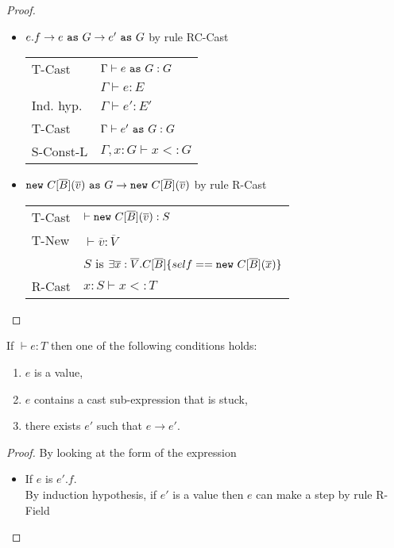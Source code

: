 \documentclass[preprint,nocopyrightspace,9pt]{sigplanconf}
\begin{document}
\begin{proof}
\begin{itemize}

\item $e.f \rightarrow e~{\tt as}~G\rightarrow e'~{\tt as}~G$ by rule {\sc RC-Cast}
\\
\begin{tabular}{ll}
{\sc T-Cast} & $\Gamma\vdash e~{\tt as}~G:G$
\\
& $\Gamma\vdash e:E$
\\
Ind. hyp. & $\Gamma\vdash e':E'$
\\
{\sc T-Cast} & $\Gamma\vdash e'~{\tt as}~G:G$
\\
{\sc S-Const-L} & $\Gamma,x:G\vdash x<:G$
\end{tabular}


\item ${\tt new}~C[\overline{B}](\overline{v})~{\tt as}~G\rightarrow {\tt new}~C[\overline{B}](\overline{v})$ by rule {\sc R-Cast}
\\
\begin{tabular}{ll}
{\sc T-Cast} & $\vdash{\tt new}~C[\overline{B}](\overline{v}):S$
\\
{\sc T-New} &  $\vdash\overline{v}:\overline{V}$
\\
& $S$ is $\exists\overline{x}:\overline{V}.C[\overline{B}]\{self=={\tt new}~C[\overline{B}](\overline{x})\}$
\\
{\sc R-Cast} & $x:S\vdash x<:T$
\end{tabular}
\end{itemize}
\end{proof}


\begin{thm}[Progress]
If $\vdash e:T$ then one of the following conditions holds:
\begin{enumerate}
\item $e$ is a value,
\item $e$ contains a cast sub-expression that is stuck,
\item there exists $e'$ such that $e\rightarrow e'$.
\end{enumerate}
\end{thm}

\begin{proof}By looking at the form of the expression
\begin{itemize}
\item If $e$ is $e'.f$.\\
By induction hypothesis, if $e'$ is a value then $e$ can make a step by rule {\sc R-Field}

\end{itemize}


\end{proof}
\end{document}
